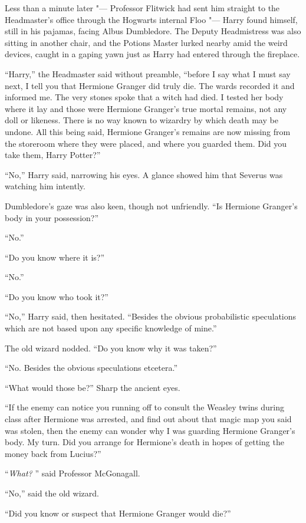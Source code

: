 Less than a minute later "--- Professor Flitwick had sent him straight to
the Headmaster's office through the Hogwarts internal Floo "--- Harry found
himself, still in his pajamas, facing Albus Dumbledore. The Deputy
Headmistress was also sitting in another chair, and the Potions Master
lurked nearby amid the weird devices, caught in a gaping yawn just as
Harry had entered through the fireplace.

``Harry,'' the Headmaster said without preamble, ``before I say what I
must say next, I tell you that Hermione Granger did truly die. The wards
recorded it and informed me. The very stones spoke that a witch had
died. I tested her body where it lay and those were Hermione Granger's
true mortal remains, not any doll or likeness. There is no way known to
wizardry by which death may be undone. All this being said, Hermione
Granger's remains are now missing from the storeroom where they were
placed, and where you guarded them. Did you take them, Harry Potter?''

``No,'' Harry said, narrowing his eyes. A glance showed him that Severus
was watching him intently.

Dumbledore's gaze was also keen, though not unfriendly. ``Is Hermione
Granger's body in your possession?''

``No.''

``Do you know where it is?''

``No.''

``Do you know who took it?''

``No,'' Harry said, then hesitated. ``Besides the obvious probabilistic
speculations which are not based upon any specific knowledge of mine.''

The old wizard nodded. ``Do you know why it was taken?''

``No. Besides the obvious speculations etcetera.''

``What would those be?'' Sharp the ancient eyes.

``If the enemy can notice you running off to consult the Weasley twins
during class after Hermione was arrested, and find out about that magic
map you said was stolen, then the enemy can wonder why I was guarding
Hermione Granger's body. My turn. Did you arrange for Hermione's death
in hopes of getting the money back from Lucius?''

``\emph{What?} '' said Professor McGonagall.

``No,'' said the old wizard.

``Did you know or suspect that Hermione Granger would die?''

